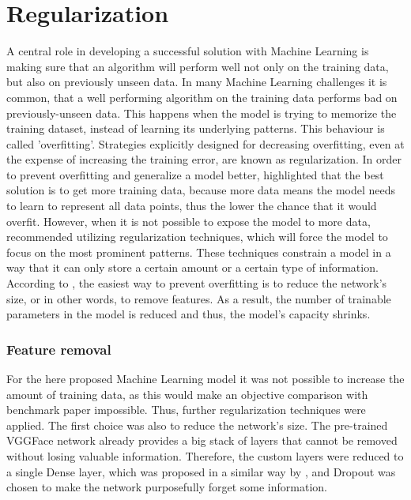 \section{Regularization}
A central role in developing a successful solution with Machine Learning is making sure that an algorithm will perform well not only on the training data, but also on previously unseen data. In many Machine Learning challenges it is common, that a well performing algorithm on the training data performs bad on previously-unseen data. This happens when the model is trying to memorize the training dataset, instead of learning its underlying patterns. This behaviour is called 'overfitting'. Strategies explicitly designed for decreasing overfitting, even at the expense of increasing the training error, are known as regularization. \citep{Goodfellow:2016:DeepLearning}
\newline\newline
In order to prevent overfitting and generalize a model better, \citet{Chollet:2017:DeepLearningPython} highlighted that the best solution is to get more training data, because more data means the model needs to learn to represent all data points, thus the lower the chance that it would overfit. However, when it is not possible to expose the model to more data, \citet{Chollet:2017:DeepLearningPython} recommended utilizing regularization techniques, which will force the model to focus on the most prominent patterns. These techniques constrain a model in a way that it can only store a certain amount or a certain type of information. According to \citet{Chollet:2017:DeepLearningPython}, the easiest way to prevent overfitting is to reduce the network's size, or in other words, to remove features. As a result, the number of trainable parameters in the model is reduced and thus, the model's capacity shrinks.

\subsubsection{Feature removal}
For the here proposed Machine Learning model it was not possible to increase the amount of training data, as this would make an objective comparison with benchmark paper impossible. Thus, further regularization techniques were applied. The first choice was also to reduce the network's size. The pre-trained VGGFace network already provides a big stack of layers that cannot be removed without losing valuable information. Therefore, the custom layers were reduced to a single Dense layer, which was proposed in a similar way by \citet{Pittaras:2017:FineTuningStrategiesComparison}, and Dropout was chosen to make the network purposefully forget some information.

